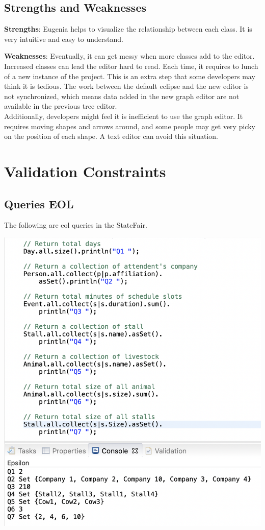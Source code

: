 \documentclass[12pt]{article}
\begin{document}
\subsection{Strengths and Weaknesses}
\noindent \textbf{Strengths}: 
Eugenia helps to visualize the relationship between each class. It is very intuitive and easy to understand.

\noindent \textbf{Weaknesses}: 
Eventually, it can get messy when more classes add to the editor. Increased classes can lead the editor hard to read. 
Each time, it requires to lunch of a new instance of the project. This is an extra step that some developers may think it is 
tedious. The work between the default eclipse and the new editor is not synchronized, which means data added in the new graph editor 
are not available in the previous tree editor.
\\Additionally, developers might feel it is inefficient to use the graph editor. 
It requires moving shapes and arrows around, and some people may get very picky on the position of each shape. A text editor can 
avoid this situation.

\pagebreak
\section{Validation Constraints}
\subsection{Queries EOL}
The following are eol queries in the StateFair.

\includegraphics[scale = 0.6]{img/eol-queries}
\end{document}
